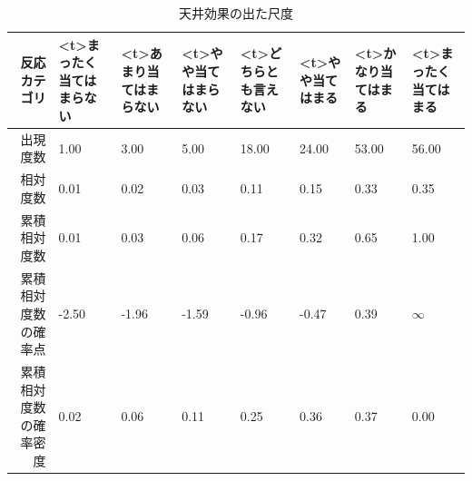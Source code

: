 \begin{table}[ht]
	\centering
	\caption{天井効果の出た尺度}
	\begin{tabular}{rp{1cm}p{1cm}p{1cm}p{1cm}p{1cm}p{1cm}p{1cm}}
		\hline
		反応カテゴリ      & \pbox<t>{\small{まったく当てはまらない}} & \pbox<t>{\small{あまり当てはまらない}} & \pbox<t>{\small{やや当てはまらない}} & \pbox<t>{\small{どちらとも言えない}} & \pbox<t>{\small{やや当てはまる}} & \pbox<t>{\small{かなり当てはまる}} & \pbox<t>{\small{まったく当てはまる}} \\
		\hline
		出現度数        & 1.00                          & 3.00                         & 5.00                        & 18.00                       & 24.00                     & 53.00                      & 56.00                       \\
		相対度数        & 0.01                          & 0.02                         & 0.03                        & 0.11                        & 0.15                      & 0.33                       & 0.35                        \\
		累積相対度数      & 0.01                          & 0.03                         & 0.06                        & 0.17                        & 0.32                      & 0.65                       & 1.00                        \\
		累積相対度数の確率点  & -2.50                         & -1.96                        & -1.59                       & -0.96                       & -0.47                     & 0.39                       & $\infty$                    \\
		累積相対度数の確率密度 & 0.02                          & 0.06                         & 0.11                        & 0.25                        & 0.36                      & 0.37                       & 0.00                        \\
		\hline
	\end{tabular}
	\label{example2_1}
\end{table}
